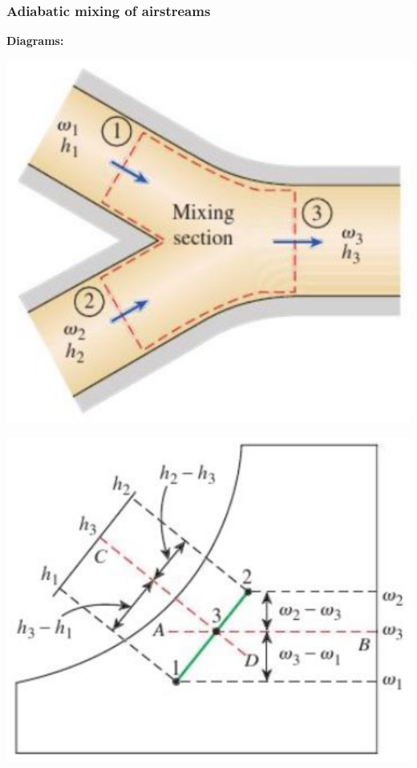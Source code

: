\documentclass[11pt]{article}
\begin{document}
\subsubsection{Adiabatic mixing of airstreams}
\label{sec:org6516f39}
\textbf{Diagrams:}
\begin{center}
\includegraphics[scale=0.8]{./images/adiabatic-mixing-of-airstreams-diagram.png}
\end{center}

\begin{center}
\includegraphics[scale=0.9]{./images/adiabatic-mixing-of-airstreams-psychrometric-chart.png}
\end{center}
\end{document}
